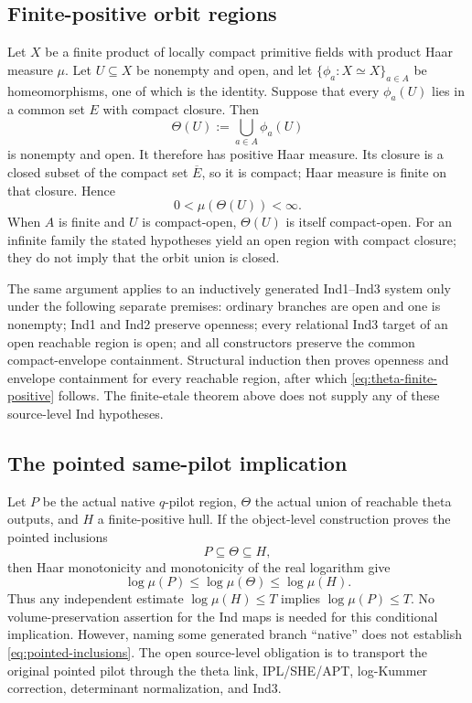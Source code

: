 \subsection{Finite-positive orbit regions}

Let $X$ be a finite product of locally compact primitive fields with product
Haar measure $\mu$.  Let $U\subseteq X$ be nonempty and open, and let
$\{\phi_a:X\simeq X\}_{a\in A}$ be homeomorphisms, one of which is the
identity.  Suppose that every $\phi_a(U)$ lies in a common set $E$ with
compact closure.  Then
\begin{equation}
 \Theta(U):=\bigcup_{a\in A}\phi_a(U)
 \label{eq:theta-orbit}
\end{equation}
is nonempty and open.  It therefore has positive Haar measure.  Its closure
is a closed subset of the compact set $\overline E$, so it is compact; Haar
measure is finite on that closure.  Hence
\begin{equation}
 0<\mu(\Theta(U))<\infty.
 \label{eq:theta-finite-positive}
\end{equation}
When $A$ is finite and $U$ is compact-open, $\Theta(U)$ is itself
compact-open.  For an infinite family the stated hypotheses yield an open
region with compact closure; they do not imply that the orbit union is
closed.

The same argument applies to an inductively generated Ind1--Ind3 system only
under the following separate premises: ordinary branches are open and one is
nonempty; Ind1 and Ind2 preserve openness; every relational Ind3 target of an
open reachable region is open; and all constructors preserve the common
compact-envelope containment.  Structural induction then proves openness
and envelope containment for every reachable region, after which
\eqref{eq:theta-finite-positive} follows.  The finite-etale theorem above
does not supply any of these source-level Ind hypotheses.

\subsection{The pointed same-pilot implication}

Let $P$ be the actual native $q$-pilot region, $\Theta$ the actual union of
reachable theta outputs, and $H$ a finite-positive hull.  If the
object-level construction proves the pointed inclusions
\begin{equation}
 P\subseteq\Theta\subseteq H,
 \label{eq:pointed-inclusions}
\end{equation}
then Haar monotonicity and monotonicity of the real logarithm give
\begin{equation}
 \log\mu(P)\leq\log\mu(\Theta)\leq\log\mu(H).
 \label{eq:same-pilot-sandwich}
\end{equation}
Thus any independent estimate $\log\mu(H)\leq T$ implies
$\log\mu(P)\leq T$.  No volume-preservation assertion for the Ind maps is
needed for this conditional implication.  However, naming some generated
branch ``native'' does not establish \eqref{eq:pointed-inclusions}.  The open
source-level obligation is to transport the original pointed pilot through
the theta link, IPL/SHE/APT, log-Kummer correction, determinant
normalization, and Ind3.

